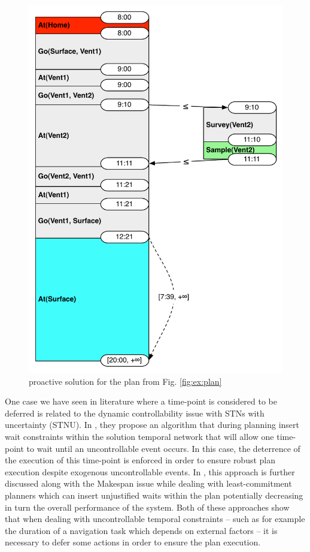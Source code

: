 \begin{figure}
  \centering
  \includegraphics[width=0.8\columnwidth]{figs/example_early}
  \caption{proactive solution for the plan from Fig. \ref{fig:ex:plan}}
  \label{fig:ex:proactive}
\end{figure}

One case we have seen in literature where a time-point is
considered to be deferred is related to the dynamic controllability
issue with STNs with uncertainty (STNU). In \cite{morris01}, they propose 
an algorithm that during planning insert wait constraints within the
solution temporal network that will allow one time-point to wait until
an uncontrollable event occurs. In this case, the deterrence of the
execution of this time-point is enforced in order to ensure robust plan
execution despite exogenous uncontrollable events. In
\cite{gallien2006},  this approach is further discussed along with the
Makespan issue while dealing with least-commitment planners which can
insert unjustified waits within the plan potentially decreasing in turn the
overall performance of the system. Both of these approaches show that
when dealing with uncontrollable temporal constraints -- such as for
example the duration of a navigation task which depends on external
factors -- it is necessary to defer some actions in order to ensure
the plan execution. 

